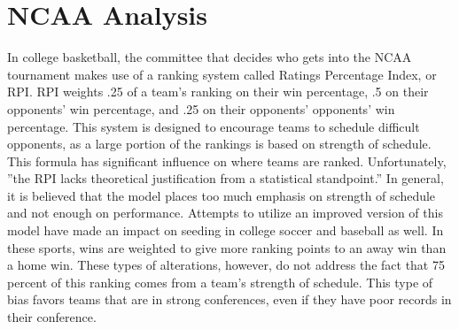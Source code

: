 \documentclass[sigconf]{acmart}
\begin{document}
\section{NCAA Analysis}
In college basketball, the committee that decides who gets into the NCAA tournament makes use of a ranking system called Ratings Percentage Index, or RPI. RPI weights .25 of a team's ranking on their win percentage, .5 on their opponents' win percentage, and .25 on their opponents' opponents' win percentage. \cite{RPI} This system is designed to encourage teams to schedule difficult opponents, as a large portion of the rankings is based on strength of schedule. This formula has significant influence on where teams are ranked. Unfortunately, ''the RPI lacks theoretical justification from a statistical standpoint.'' \cite{RPI} In general, it is believed that the model places too much emphasis on strength of schedule and not enough on performance. Attempts to utilize an improved version of this model have made an impact on seeding in college soccer and baseball as well. In these sports, wins are weighted to give more ranking points to an away win than a home win.\cite{RPI} These types of alterations, however, do not address the fact that 75 percent of this ranking comes from a team's strength of schedule. This type of bias favors teams that are in strong conferences, even if they have poor records in their conference. 
\end{document}
